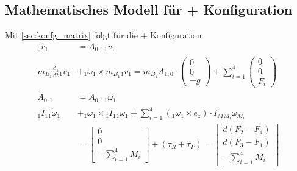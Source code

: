 \subsection{Mathematisches Modell für + Konfiguration}\label{sub:konfg_plus}
Mit \ref{sec:konfg_matrix} folgt für die + Konfiguration 
\begin{align}
    {_{0}\dot{r}_{1}} &= A_{0, 1} {_{1}v_{1}} \\
    m_{B_1} \frac{d_1}{dt} {_{1}v_{1}} &+ {_{1}\omega_{1}} \times m_{B_1} {_{1}v_{1}} = m_{B_1} A_{1, 0} \cdot \begin{pmatrix} 0 \\ 0 \\ -g \end{pmatrix} + \sum_{i = 1}^4 {\begin{pmatrix} 0 \\ 0 \\ F_i \end{pmatrix}} \\
    {{\dot{A}_{0, 1}}} &= {A_{0, 1}} \tilde{_{1} {\omega}_{1}}\\
    {_{1} I_{1}} {_{1} \dot{\omega}_{1}} &+ {_{1} {\omega}_{1}} \times {_{1} I_{1}} {_{1} {\omega}_{1}} + \sum_{i=1}^{4}{({_{1}{\omega}_{1}} \times e_z) \cdot I_{M} {_{M_i}\omega_{M_i}} } \\
    &= \begin{bmatrix} 0 \\ 0 \\ -\sum_{i = 1}^{4}{M_i} \end{bmatrix} + (\tau_{R} + \tau_{P}) = \begin{bmatrix} d(F_2 - F_4) \\ d(F_3 - F_1) \\ -\sum_{i = 1}^{4}{M_i} \end{bmatrix}
\end{align}

